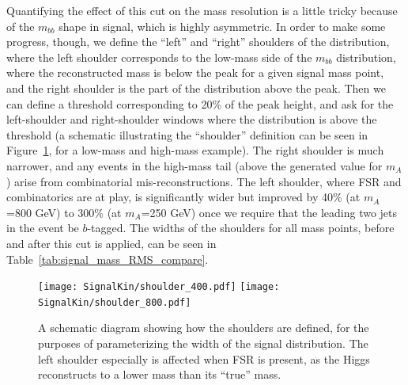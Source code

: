  

Quantifying the effect of this cut on the mass resolution is a little tricky because of the
$m_{bb}$ shape in signal, which is highly asymmetric.  In order to make some progress, though,
we define the ``left'' and ``right'' shoulders of the distribution, where the left shoulder
corresponds to the low-mass side of the $m_{bb}$ distribution, where the reconstructed mass 
is below the peak for a given signal mass point,
and the right shoulder is the part of the distribution above the peak.  Then we can define
a threshold corresponding to 20\% of the peak height, and ask for the left-shoulder and right-shoulder
windows where the distribution is above the threshold (a schematic illustrating the ``shoulder''
definition can be seen in Figure~\ref{fig:shoulders}, for a low-mass and high-mass example).  
The right shoulder is much narrower,
and any events in the high-mass tail (above the generated value for $m_A$) arise from 
combinatorial mis-reconstructions.  The left shoulder, where FSR and combinatorics are
at play, is significantly wider but improved by 40\% (at $m_A$=800 GeV) to 300\% (at $m_A$=250 GeV)
once we require that the leading two jets in the event be $b$-tagged.  The widths of the shoulders
for all mass points, before and after this cut is applied, can be seen in Table~\ref{tab:signal_mass_RMS_compare}.

\begin{figure}[hbt]
  \texttt{[image: SignalKin/shoulder\_400.pdf]}
  \texttt{[image: SignalKin/shoulder\_800.pdf]}
  \caption{A schematic diagram showing how the shoulders are defined,
  for the purposes of parameterizing the width of the signal distribution.
  The left shoulder especially is affected when FSR is present, as the
  Higgs reconstructs to a lower mass than its ``true'' mass.  \label{fig:shoulders}}
\end{figure}



